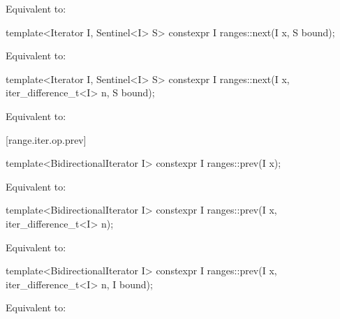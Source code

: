 \begin{itemdescr}
\pnum
\effects Equivalent to: 
\end{itemdescr}

%
\begin{itemdecl}
template<Iterator I, Sentinel<I> S>
  constexpr I ranges::next(I x, S bound);
\end{itemdecl}

\begin{itemdescr}
\pnum
\effects Equivalent to: 
\end{itemdescr}

%
\begin{itemdecl}
template<Iterator I, Sentinel<I> S>
  constexpr I ranges::next(I x, iter_difference_t<I> n, S bound);
\end{itemdecl}

\begin{itemdescr}
\pnum
\effects Equivalent to: 
\end{itemdescr}

[range.iter.op.prev]{}
%
\begin{itemdecl}
template<BidirectionalIterator I>
  constexpr I ranges::prev(I x);
\end{itemdecl}

\begin{itemdescr}
\pnum
\effects Equivalent to: 
\end{itemdescr}

%
\begin{itemdecl}
template<BidirectionalIterator I>
  constexpr I ranges::prev(I x, iter_difference_t<I> n);
\end{itemdecl}

\begin{itemdescr}
\pnum
\effects Equivalent to: 
\end{itemdescr}

%
\begin{itemdecl}
template<BidirectionalIterator I>
  constexpr I ranges::prev(I x, iter_difference_t<I> n, I bound);
\end{itemdecl}

\begin{itemdescr}
\pnum
\effects Equivalent to: 
\end{itemdescr}

